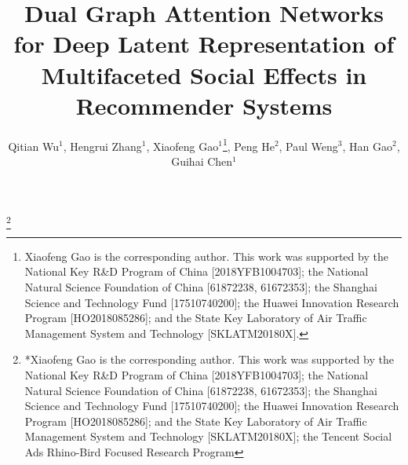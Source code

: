 \documentclass[sigconf]{acmart}
\begin{document}
\title{Dual Graph Attention Networks for Deep Latent Representation of Multifaceted Social Effects in Recommender Systems}

\author{Qitian Wu$^1$, Hengrui Zhang$^1$, Xiaofeng Gao$^1$\footnote{Xiaofeng Gao is the corresponding author. This work was supported by the National Key R\&D Program of China [2018YFB1004703]; the National Natural Science Foundation of China [61872238, 61672353]; the Shanghai Science and Technology Fund [17510740200]; the Huawei Innovation Research Program [HO2018085286]; and the State Key Laboratory of Air Traffic Management System and Technology [SKLATM20180X].}, Peng He$^2$, Paul Weng$^3$, Han Gao$^2$, Guihai Chen$^1$}
 

\thanks{*Xiaofeng Gao is the corresponding author. This work was supported by the National Key R\&D Program of China [2018YFB1004703]; the National Natural Science Foundation of China [61872238, 61672353]; the Shanghai Science and Technology Fund [17510740200]; the Huawei Innovation Research Program [HO2018085286]; and the State Key Laboratory of Air Traffic Management System and Technology [SKLATM20180X]; the Tencent Social Ads Rhino-Bird Focused Research Program}

\begin{comment}
\author{\IEEEauthorblockN{Qitian Wu$^1$, Hengrui zhang$^1$, Xiaofeng Gao$^1$\footnote{Xiaofeng Gao is the corresponding author.}, Peng He$^2$, Paul Weng$^1$, Han Gao$^2$, Guihai Chen$^1$}
	$^1$Shanghai Jiao Tong University, China\\
	$^2$WeChat, Tencent Inc.\\
	\{echo740, sqstardust\}@sjtu.edu.cn, gao-xf@cs.sjtu.edu.cn, paulhe@tencent.com, paul.weng@sjtu.edu.cn, alangao@tencent.com,
	gchen@cs.sjtu.edu.cn
}
\thanks{*Xiaofeng Gao is the corresponding author.}
\end{comment}
\end{document}
